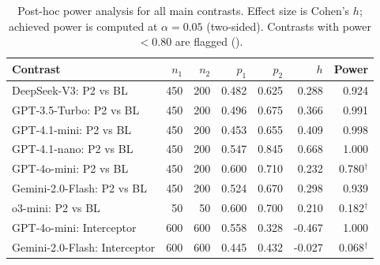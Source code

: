\begin{table}[t]
\centering
\caption{Post-hoc power analysis for all main contrasts. Effect size is Cohen's $h$; achieved power is computed at $\alpha = 0.05$ (two-sided). Contrasts with power $< 0.80$ are flagged (\dag).}
\label{tab:power}
\small
\begin{tabular}{l r r r r r r}
\toprule
Contrast & $n_1$ & $n_2$ & $p_1$ & $p_2$ & $h$ & Power \\
\midrule
DeepSeek-V3: P2 vs BL & 450 & 200 & 0.482 & 0.625 & 0.288 & 0.924 \\
GPT-3.5-Turbo: P2 vs BL & 450 & 200 & 0.496 & 0.675 & 0.366 & 0.991 \\
GPT-4.1-mini: P2 vs BL & 450 & 200 & 0.453 & 0.655 & 0.409 & 0.998 \\
GPT-4.1-nano: P2 vs BL & 450 & 200 & 0.547 & 0.845 & 0.668 & 1.000 \\
GPT-4o-mini: P2 vs BL & 450 & 200 & 0.600 & 0.710 & 0.232 & 0.780$^{\dag}$ \\
Gemini-2.0-Flash: P2 vs BL & 450 & 200 & 0.524 & 0.670 & 0.298 & 0.939 \\
o3-mini: P2 vs BL & 50 & 50 & 0.600 & 0.700 & 0.210 & 0.182$^{\dag}$ \\
GPT-4o-mini: Interceptor & 600 & 600 & 0.558 & 0.328 & -0.467 & 1.000 \\
Gemini-2.0-Flash: Interceptor & 600 & 600 & 0.445 & 0.432 & -0.027 & 0.068$^{\dag}$ \\
\bottomrule
\end{tabular}
\end{table}